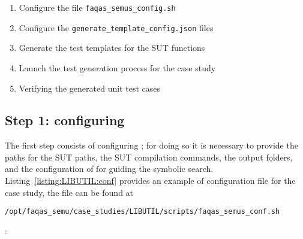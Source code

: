 \begin{enumerate}
    \item Configure the file \texttt{faqas\_semus\_config.sh}
    \item Configure the \texttt{generate\_template\_config.json} files
    \item Generate the test templates for the SUT functions
    \item Launch the test generation process for the case study
    \item Verifying the generated unit test cases
\end{enumerate}


\subsection{Step 1: configuring \SEMUS}

The first step consists of configuring \SEMUS; for doing so it is necessary to provide the paths for the SUT paths, the SUT compilation commands, the output folders, and the configuration of \SEMU for guiding the symbolic search. Listing~\ref{listing:LIBUTIL:conf} provides an example of configuration file for the case study, the file can be found at \begin{footnotesize}\texttt{/opt/faqas\_semu/case\_studies/LIBUTIL/scripts/faqas\_semus\_conf.sh}\end{footnotesize}: 

